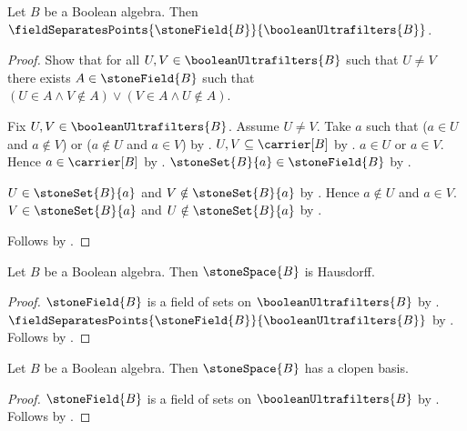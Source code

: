 \begin{theorem}\label{stone_field_separates_points}
    Let $B$ be a Boolean algebra.
    Then $\fieldSeparatesPoints
        {\stoneField{B}}{\booleanUltrafilters{B}}$.
\end{theorem}
\begin{proof}
    Show that for all $U,V\in\booleanUltrafilters{B}$ such that
        $U\neq V$ there exists $A\in\stoneField{B}$ such that
        $(U\in A\land V\notin A)\lor
            (V\in A\land U\notin A)$.
    \begin{subproof}
        Fix $U,V\in\booleanUltrafilters{B}$.
        Assume $U\neq V$.
        Take $a$ such that
            ($a\in U$ and $a\notin V$) or
            ($a\notin U$ and $a\in V$) by .
        $U,V\subseteq\carrier[B]$ by
            .
        $a\in U$ or $a\in V$.
        Hence $a\in\carrier[B]$ by .
        $\stoneSet{B}{a}\in\stoneField{B}$ by
            .
        \begin{byCase}
            $U\in\stoneSet{B}{a}$ and
                $V\notin\stoneSet{B}{a}$ by
                .
            Hence $a\notin U$ and $a\in V$.
            $V\in\stoneSet{B}{a}$ and
                $U\notin\stoneSet{B}{a}$ by
                .
        \end{byCase}
    \end{subproof}
    Follows by .
\end{proof}

\begin{theorem}\label{stone_space_is_hausdorff}
    Let $B$ be a Boolean algebra.
    Then $\stoneSpace{B}$ is Hausdorff.
\end{theorem}
\begin{proof}
    $\stoneField{B}$ is a field of sets on
        $\booleanUltrafilters{B}$ by
        .
    $\fieldSeparatesPoints
        {\stoneField{B}}{\booleanUltrafilters{B}}$ by
        .
    Follows by
        .
\end{proof}

\begin{theorem}\label{stone_space_has_clopen_basis}
    Let $B$ be a Boolean algebra.
    Then $\stoneSpace{B}$ has a clopen basis.
\end{theorem}
\begin{proof}
    $\stoneField{B}$ is a field of sets on
        $\booleanUltrafilters{B}$ by
        .
    Follows by
        .
\end{proof}

